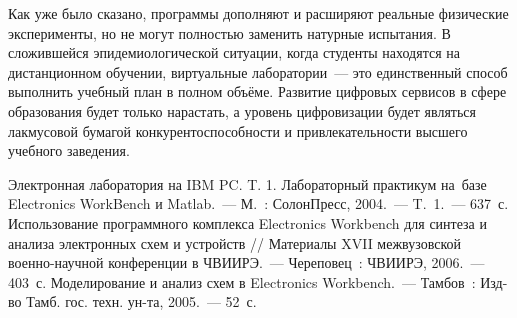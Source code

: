 Как уже было сказано, программы дополняют и расширяют реальные физические эксперименты, но не могут полностью заменить натурные испытания. В сложившейся эпидемиологической ситуации, когда студенты
находятся на дистанционном обучении, виртуальные лаборатории~--- это
единственный способ выполнить учебный план в полном объёме. Развитие
цифровых сервисов в сфере образования будет только нарастать, а уровень
цифровизации будет являться лакмусовой бумагой конкурентоспособности и
привлекательности высшего учебного заведения.

\begin{thebibliography}{99}

\bibitem{} Электронная лаборатория на IBM PC. T. 1. Лабораторный практикум на~базе Electronics WorkBench и Matlab.~--- М.~: СолонПресс, 2004.~--- T.~1.~--- 637~с.
\bibitem{} Использование программного комплекса Electronics Workbench для синтеза и анализа электронных схем и устройств // Материалы XVII межвузовской военно-научной конференции в ЧВИИРЭ.~--- Череповец~: ЧВИИРЭ, 2006.~--- 403~с.
\bibitem{} Моделирование и анализ схем в Electronics Workbench.~--- Тамбов~: Изд-во Тамб. гос. техн. ун-та, 2005.~--- 52~с.


\end{thebibliography}
